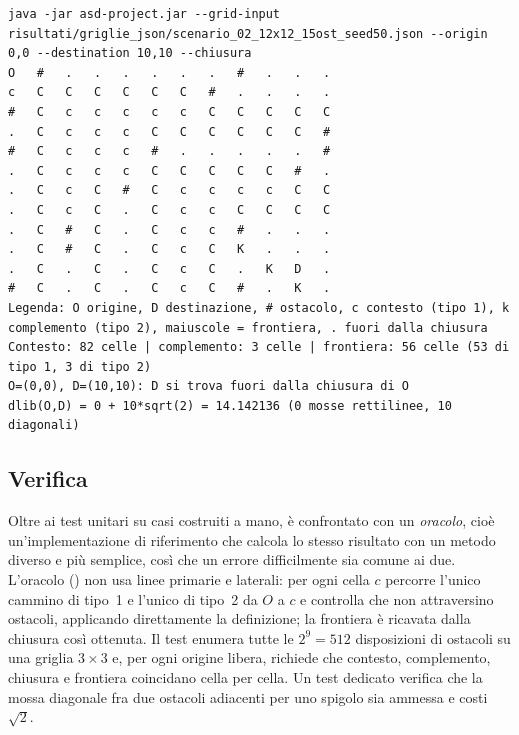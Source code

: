 \begin{lstlisting}
java -jar asd-project.jar --grid-input risultati/griglie_json/scenario_02_12x12_15ost_seed50.json --origin 0,0 --destination 10,10 --chiusura
O   #   .   .   .   .   .   .   #   .   .   .
c   C   C   C   C   C   C   #   .   .   .   .
#   C   c   c   c   c   c   C   C   C   C   C
.   C   c   c   c   C   C   C   C   C   C   #
#   C   c   c   c   #   .   .   .   .   .   #
.   C   c   c   c   C   C   C   C   C   #   .
.   C   c   C   #   C   c   c   c   c   C   C
.   C   c   C   .   C   c   c   C   C   C   C
.   C   #   C   .   C   c   c   #   .   .   .
.   C   #   C   .   C   c   C   K   .   .   .
.   C   .   C   .   C   c   C   .   K   D   .
#   C   .   C   .   C   c   C   #   .   K   .
Legenda: O origine, D destinazione, # ostacolo, c contesto (tipo 1), k complemento (tipo 2), maiuscole = frontiera, . fuori dalla chiusura
Contesto: 82 celle | complemento: 3 celle | frontiera: 56 celle (53 di tipo 1, 3 di tipo 2)
O=(0,0), D=(10,10): D si trova fuori dalla chiusura di O
dlib(O,D) = 0 + 10*sqrt(2) = 14.142136 (0 mosse rettilinee, 10 diagonali)
\end{lstlisting}

\subsection{Verifica}

Oltre ai test unitari su casi costruiti a mano,  è
confrontato con un \emph{oracolo}, cioè un'implementazione di riferimento che
calcola lo stesso risultato con un metodo diverso e più semplice, così che un
errore difficilmente sia comune ai due. L'oracolo
() non usa linee primarie e laterali: per ogni
cella $c$ percorre l'unico cammino di tipo~1 e l'unico di tipo~2 da $O$ a $c$
e controlla che non attraversino ostacoli, applicando direttamente la
definizione; la frontiera è ricavata dalla chiusura così ottenuta. Il test
enumera tutte le $2^9 = 512$ disposizioni di ostacoli su una griglia
$3\times3$ e, per ogni origine libera, richiede che contesto, complemento,
chiusura e frontiera coincidano cella per cella. Un test dedicato verifica che la mossa
diagonale fra due ostacoli adiacenti per uno spigolo sia ammessa e costi
$\sqrt{2}$.

